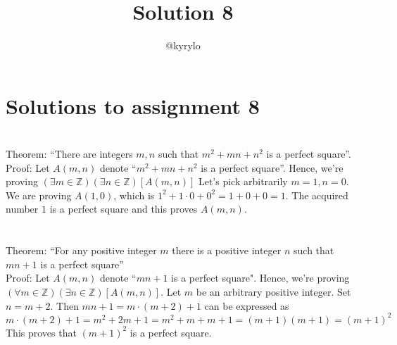 \documentclass{article}
\title{Solution 8}
\author{@kyrylo}
\begin{document}
\section*{Solutions to assignment 8}

\section{}

Theorem: ``There are integers $m, n$ such that $m^2 + mn + n^2$ is a perfect
square''.
\\
Proof: Let $A(m, n)$ denote ``$m^2 + mn + n^2$ is a perfect square''.
Hence, we're proving $(\exists m \in \mathbb{Z})(\exists n \in \mathbb{Z})[A(m, n)]$
Let's pick arbitrarily $m = 1, n = 0$. We are proving $A(1, 0)$, which is
$1^2 + 1 \cdot 0 + 0^2 = 1 + 0 + 0 = 1$. The acquired number $1$ is a perfect square and this
proves $A(m, n)$.

\section{}

Theorem: ``For any positive integer $m$ there is a positive integer $n$ such
that $mn + 1$ is a perfect square''
\\
Proof: Let $A(m, n)$ denote ``$mn + 1$ is a perfect square". Hence, we're
proving $(\forall m \in \mathbb{Z})(\exists n \in \mathbb{Z})[A(m, n)]$. Let $m$
be an arbitrary positive integer. Set $n = m + 2$. Then $mn + 1 = m \cdot (m +
2) + 1$ can be expressed as
\\
$m \cdot (m + 2) + 1 = m^2 + 2m + 1 = m^2 + m + m + 1 = (m + 1)(m + 1) = (m + 1)^2$
\\
This proves that $(m + 1)^2$ is a perfect square.
\end{document}
